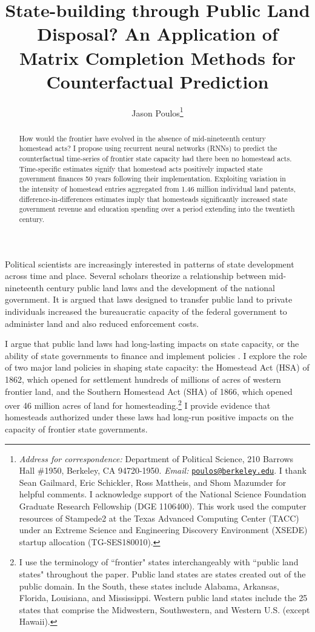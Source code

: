 \documentclass[12pt]{article}
\title{State-building through Public Land Disposal? An Application of Matrix Completion Methods for Counterfactual Prediction}
\author[ ]{Jason Poulos\thanks{\emph{Address for correspondence:} Department of Political Science, 210 Barrows Hall \#1950, Berkeley, CA 94720-1950. \emph{Email:} \href{mailto:poulos@berkeley.edu}{\nolinkurl{poulos@berkeley.edu}}. I thank Sean Gailmard, Eric Schickler, Ross Mattheis, and Shom Mazumder for helpful comments. I acknowledge support of the National Science Foundation Graduate Research Fellowship (DGE 1106400). This work used the computer resources of Stampede2 at the Texas Advanced Computing Center (TACC) under an Extreme Science and Engineering Discovery Environment (XSEDE) startup allocation (TG-SES180010).}}
\affil[ ]{University of California, Berkeley}
\date{}
\begin{document}
 
 
\begin{singlespacing}
\maketitle  
\end{singlespacing}

\thispagestyle{empty}

\begin{abstract}  
\noindent
How would the frontier have evolved in the absence of mid-nineteenth century homestead acts? I propose using recurrent neural networks (RNNs) to predict the counterfactual time-series of frontier state capacity had there been no homestead acts. Time-specific estimates signify that homestead acts positively impacted state government finances 50 years following their implementation. Exploiting variation in the intensity of homestead entries aggregated from 1.46 million individual land patents, difference-in-differences estimates imply that homesteads significantly increased state government revenue and education spending over a period extending into the twentieth century.\\
\end{abstract}	

\pagebreak
{}%

Political scientists are increasingly interested in patterns of state development across time and place. Several scholars \citep[e.g.,][]{bensel1990,murtazashvili2013political,frymer2014rush} theorize a relationship between mid-nineteenth century public land laws and the development of the national government. It is argued that laws designed to transfer public land to private individuals increased the bureaucratic capacity of the federal government to administer land and also reduced enforcement costs. 

I argue that public land laws had long-lasting impacts on state capacity, or the ability of state governments to finance and implement policies \citep{besley2010state}. I explore the role of two major land policies in shaping state capacity: the Homestead Act (HSA) of 1862, which opened for settlement hundreds of millions of acres of western frontier land, and the Southern Homestead Act (SHA) of 1866, which opened over 46 million acres of land for homesteading.\footnote{I use the terminology of ``frontier" states interchangeably with ``public land states" throughout the paper. Public land states are states created out of the public domain. In the South, these states include Alabama, Arkansas, Florida, Louisiana, and Mississippi. Western public land states include the 25 states that comprise the Midwestern, Southwestern, and Western U.S. (except Hawaii).} I provide evidence that homesteads authorized under these laws had long-run positive impacts on the capacity of frontier state governments. 
\end{document}
